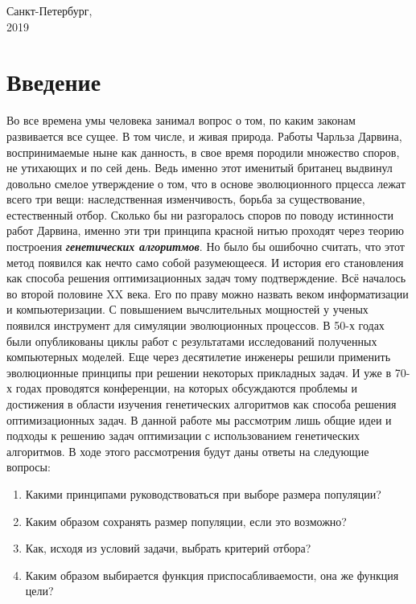 \vspace{1.2cm}
\begin{center}
Санкт-Петербург,\\
2019
\end{center}


\pagestyle{fancy}
\fancyhf{}
\fancyfoot[C]{\thepage}
\renewcommand{\headrulewidth}{0pt}
\renewcommand{\footrulewidth}{0pt}
\tableofcontents
\pagebreak

\newcommand{\defn}[1]{\textbf{\textit{#1}}}

\chapter*{Введение}
Во все времена умы человека занимал вопрос о том, по каким законам развивается все сущее. В том числе, и живая природа. Работы Чарльза Дарвина, воспринимаемые ныне как данность, в свое время породили множество споров, не утихающих и по сей день. Ведь именно этот именитый британец выдвинул довольно смелое утверждение о том, что в основе эволюционного прцесса лежат всего три вещи: наследственная изменчивость, борьба за существование, естественный отбор. Сколько бы ни разгоралось споров по поводу истинности работ Дарвина, именно эти три принципа красной нитью проходят через теорию построения \defn{генетических алгоритмов}.
Но было бы ошибочно считать, что этот метод появился как нечто само собой разумеющееся. И история его становления как способа решения оптимизационных задач тому подтверждение. Всё началось во второй половине XX века. Его по праву можно назвать веком информатизации и компьютеризации. С повышением вычслительных мощностей у ученых появился инструмент для симуляции эволюционных процессов. В 50-х годах были опубликованы циклы работ с результатами исследований полученных компьютерных моделей. Еще через десятилетие инженеры решили применить эволюционные принципы при решении некоторых прикладных задач. И уже в 70-х годах проводятся конференции, на которых обсуждаются проблемы и достижения в области изучения генетических алгоритмов как способа решения оптимизационных задач.
В данной работе мы рассмотрим лишь общие идеи и подходы к решению задач оптимизации с использованием генетических алгоритмов. В ходе этого рассмотрения будут даны ответы на следующие вопросы:
\begin{enumerate}
\item Какими принципами руководствоваться при выборе размера популяции?
\item Каким образом сохранять размер популяции, если это возможно?
\item Как, исходя из условий задачи, выбрать критерий отбора?
\item Каким образом выбирается функция приспосабливаемости, она же функция цели?
\end{enumerate}
